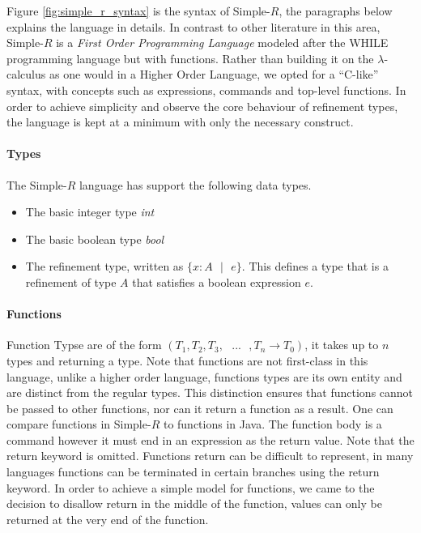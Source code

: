 \documentclass[a4paper,12pt]{report}
\begin{document}
\par
Figure \ref{fig:simple_r_syntax} is the syntax of Simple-$R$, the paragraphs below 
explains the language in details. In contrast to other literature in this area, 
Simple-$R$ is a \textit{First Order Programming Language} \cite{FOL} modeled 
after the WHILE \cite{whileLanguage} programming language but with functions.
Rather than building it on the $\lambda$-calculus as one would in 
a Higher Order Language, we opted for a ``C-like'' syntax, with concepts such as 
expressions, commands and top-level functions. 
In order to achieve simplicity and observe the core behaviour of refinement 
types, the language is kept at a minimum with only the necessary construct. 

\paragraph{Types} The Simple-$R$ language has support the following data types. 
\begin{itemize}
  \item The basic integer type \textit{int}
  \item The basic boolean type \textit{bool}
  \item The refinement type, written as $\{x: A\text{ }|\text{ }e\}$. This defines 
  a type that is a refinement of type $A$ that satisfies a boolean expression $e$.
\end{itemize}

\paragraph{Functions}
Function Typse are of the form $(T_1, T_2,T_3,\text{ }...\text{ },T_n \longrightarrow T_0)$, 
it takes up to $n$ types and returning a type. Note that functions are 
not first-class in this language, unlike a higher order 
language, functions types are its own entity and are distinct from the regular 
types. This distinction ensures that functions cannot be passed to 
other functions, nor can it return a function as a result. One can compare 
functions in Simple-$R$ to functions in Java. The function body is a 
command however it must end in an expression as the return value. Note that the 
return keyword is omitted. Functions return can be difficult to represent, in many 
languages functions can be terminated in certain branches using the 
return keyword. In order to achieve a simple model for functions, we came to 
the decision to disallow return in the middle of the function, values can 
only be returned at the very end of the function.
\end{document}

